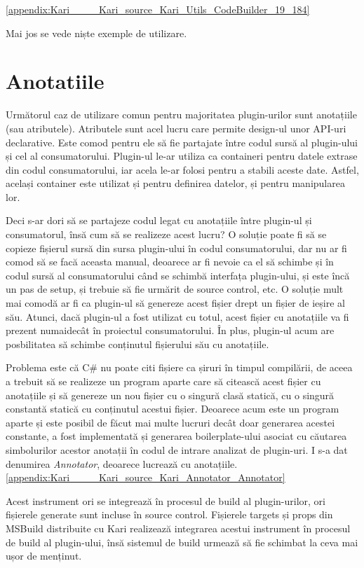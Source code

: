 \documentclass[a4paper,12pt]{report}
\begin{document}
\ref{appendix:Kari____Kari_source_Kari_Utils_CodeBuilder_19_184}

Mai jos se vede niște exemple de utilizare.

\section{Anotatiile}

Următorul caz de utilizare comun pentru majoritatea plugin-urilor sunt anotațiile (sau atributele).
Atributele sunt acel lucru care permite design-ul unor API-uri declarative.
Este comod pentru ele să fie partajate între codul sursă al plugin-ului și cel al consumatorului.
Plugin-ul le-ar utiliza ca containeri pentru datele extrase din codul consumatorului, iar acela le-ar folosi pentru a stabili aceste date.
Astfel, același container este utilizat și pentru definirea datelor, și pentru manipularea lor.

Deci s-ar dori să se partajeze codul legat cu anotațiile între plugin-ul și consumatorul, însă cum să se realizeze acest lucru?
O soluție poate fi să se copieze fișierul sursă din sursa plugin-ului în codul consumatorului, dar nu ar fi comod să se facă aceasta manual, deoarece ar fi nevoie ca el să schimbe și în codul sursă al consumatorului când se schimbă interfața plugin-ului, și este încă un pas de setup, și trebuie să fie urmărit de source control, etc.
O soluție mult mai comodă ar fi ca plugin-ul să genereze acest fișier drept un fișier de ieșire al său.
Atunci, dacă plugin-ul a fost utilizat cu totul, acest fișier cu anotațiile va fi prezent numaidecât în proiectul consumatorului.
În plus, plugin-ul acum are posbilitatea să schimbe conținutul fișierului său cu anotațiile.

Problema este că C\# nu poate citi fișiere ca șiruri în timpul compilării, de aceea a trebuit să se realizeze un program aparte care să citească acest fișier cu anotațiile și să genereze un nou fișier cu o singură clasă statică, cu o singură constantă statică cu conținutul acestui fișier.
Deoarece acum este un program aparte și este posibil de făcut mai multe lucruri decât doar generarea acestei constante, a fost implementată și generarea boilerplate-ului asociat cu căutarea simbolurilor acestor anotații în codul de intrare analizat de plugin-uri.
I s-a dat denumirea \emph{Annotator}, deoarece lucrează cu anotațiile.\ref{appendix:Kari____Kari_source_Kari_Annotator_Annotator}

Acest instrument ori se integrează în procesul de build al plugin-urilor, ori fișierele generate sunt incluse în source control.
Fișierele targets și props din MSBuild distribuite cu Kari realizează integrarea acestui instrument în procesul de build al plugin-ului,
însă sistemul de build urmează să fie schimbat la ceva mai ușor de menținut. 
\end{document}
